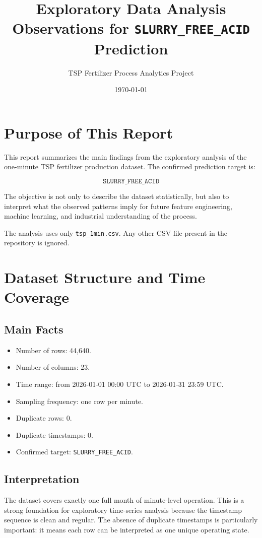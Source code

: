 \documentclass[11pt,a4paper]{article}
\title{Exploratory Data Analysis Observations for \texttt{SLURRY\_FREE\_ACID} Prediction}
\author{TSP Fertilizer Process Analytics Project}
\date{\today}
\begin{document}
\maketitle

\section{Purpose of This Report}

This report summarizes the main findings from the exploratory analysis of the one-minute TSP fertilizer production dataset. The confirmed prediction target is:

\[
\texttt{SLURRY\_FREE\_ACID}
\]

The objective is not only to describe the dataset statistically, but also to interpret what the observed patterns imply for future feature engineering, machine learning, and industrial understanding of the process.

The analysis uses only \texttt{tsp\_1min.csv}. Any other CSV file present in the repository is ignored.

\section{Dataset Structure and Time Coverage}

\subsection{Main Facts}

\begin{itemize}
    \item Number of rows: 44,640.
    \item Number of columns: 23.
    \item Time range: from 2026-01-01 00:00 UTC to 2026-01-31 23:59 UTC.
    \item Sampling frequency: one row per minute.
    \item Duplicate rows: 0.
    \item Duplicate timestamps: 0.
    \item Confirmed target: \texttt{SLURRY\_FREE\_ACID}.
\end{itemize}

\subsection{Interpretation}

The dataset covers exactly one full month of minute-level operation. This is a strong foundation for exploratory time-series analysis because the timestamp sequence is clean and regular. The absence of duplicate timestamps is particularly important: it means each row can be interpreted as one unique operating state.
\end{document}

